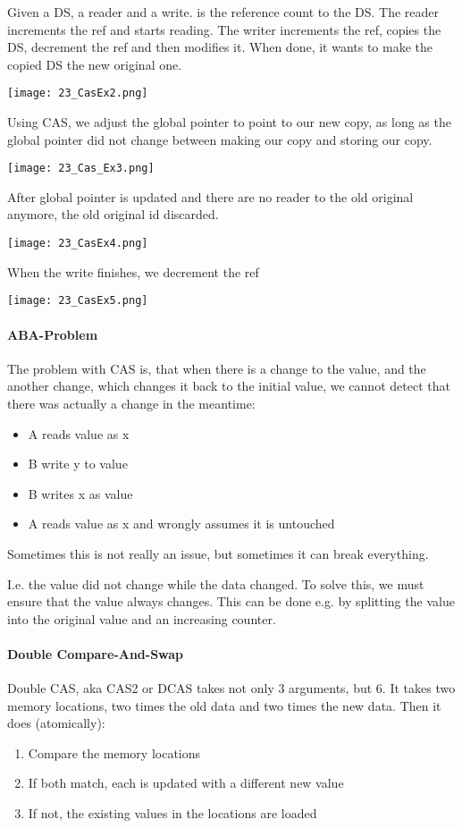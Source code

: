 Given a DS, a reader and a write.  is the reference count to the DS. The reader increments the ref and starts reading. The writer increments the ref, copies the DS, decrement the ref and then modifies it. When done, it wants to make the copied DS the new original one.

\texttt{[image: 23\_CasEx2.png]}

Using CAS, we adjust the global pointer to point to our new copy, as long as the global pointer did not change between making our copy and storing our copy.

\texttt{[image: 23\_Cas\_Ex3.png]}

After global pointer is updated and there are no reader to the old original anymore, the old original id discarded.

\texttt{[image: 23\_CasEx4.png]}

When the write finishes, we decrement the ref

\texttt{[image: 23\_CasEx5.png]}

\paragraph{ABA-Problem}
The problem with CAS is, that when there is a change to the value, and the another change, which changes it back to the initial value, we cannot detect that there was actually a change in the meantime:

\begin{itemize}
    \item A reads value as x
    \item B write y to value
    \item B writes x as value
    \item A reads value as x and wrongly assumes it is untouched
\end{itemize}

Sometimes this is not really an issue, but sometimes it can break everything.

I.e. the value did not change while the data changed. To solve this, we must ensure that the value always changes. This can be done e.g. by splitting the value into the original value and an increasing counter. 

\paragraph{Double Compare-And-Swap}
Double CAS, aka CAS2 or DCAS takes not only $3$ arguments, but $6$. It takes two memory locations, two times the old data and two times the new data. Then it does (atomically):
\begin{enumerate}
    \item Compare the memory locations
    \item If both match, each is updated with a different new value
    \item If not, the existing values in the locations are loaded
\end{enumerate}

